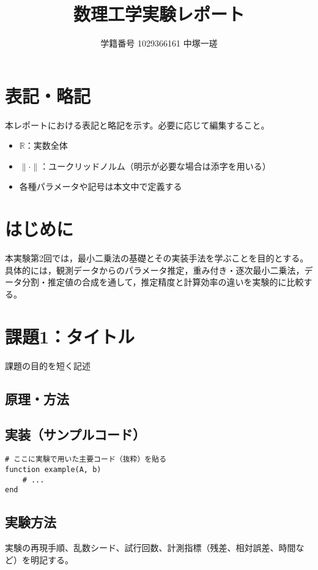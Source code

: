 \documentclass[a4paper,11pt]{ltjsarticle}
\title{数理工学実験レポート\\[4pt]\large \ChapterTitle}
\author{学籍番号 1029366161 \quad 中塚一瑳}
\date{\ExperimentDate}
\newcommand{\R}{\mathbb{R}}
\begin{document}
\maketitle
\begin{abstract}
\end{abstract}

\tableofcontents
\clearpage

\section*{表記・略記}
本レポートにおける表記と略記を示す。必要に応じて編集すること。
\begin{itemize}
  \item $\R$：実数全体
  \item $\|\cdot\|$：ユークリッドノルム（明示が必要な場合は添字を用いる）
  \item 各種パラメータや記号は本文中で定義する
\end{itemize}

\section{はじめに}
本実験第2回では，最小二乗法の基礎とその実装手法を学ぶことを目的とする。具体的には，観測データからのパラメータ推定，重み付き・逐次最小二乗法，データ分割・推定値の合成を通して，推定精度と計算効率の違いを実験的に比較する。


\section{課題1：タイトル}{課題の目的を短く記述}
\subsection{原理・方法}
\subsection{実装（サンプルコード）}
\begin{lstlisting}
# ここに実験で用いた主要コード（抜粋）を貼る
function example(A, b)
    # ...
end
\end{lstlisting}

\subsection{実験方法}
実験の再現手順、乱数シード、試行回数、計測指標（残差、相対誤差、時間など）を明記する。
\end{document}
